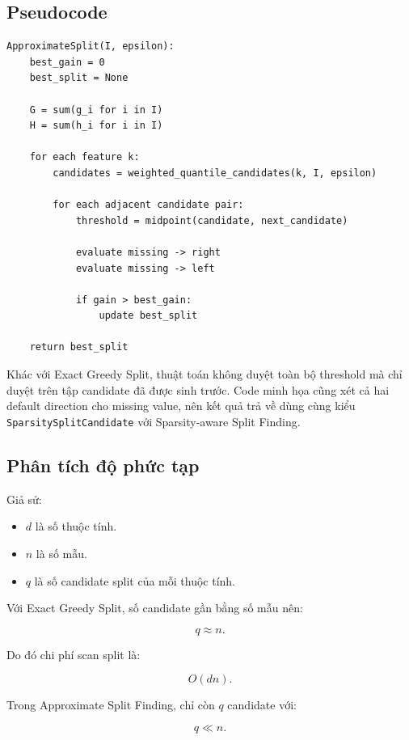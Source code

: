 \subsection{Pseudocode}

\begin{lstlisting}[style=pseudocode,
caption={Approximate Split Finding},
label={lst:approx_split}]
ApproximateSplit(I, epsilon):
    best_gain = 0
    best_split = None

    G = sum(g_i for i in I)
    H = sum(h_i for i in I)

    for each feature k:
        candidates = weighted_quantile_candidates(k, I, epsilon)

        for each adjacent candidate pair:
            threshold = midpoint(candidate, next_candidate)

            evaluate missing -> right
            evaluate missing -> left

            if gain > best_gain:
                update best_split

    return best_split
\end{lstlisting}

Khác với Exact Greedy Split, thuật toán không duyệt toàn bộ threshold mà chỉ duyệt trên tập candidate đã được sinh trước. Code minh họa cũng xét cả hai default direction cho missing value, nên kết quả trả về dùng cùng kiểu \texttt{SparsitySplitCandidate} với Sparsity-aware Split Finding.

\subsection{Phân tích độ phức tạp}

Giả sử:

\begin{itemize}
    \item $d$ là số thuộc tính.
    \item $n$ là số mẫu.
    \item $q$ là số candidate split của mỗi thuộc tính.
\end{itemize}

Với Exact Greedy Split, số candidate gần bằng số mẫu nên:

\[
q \approx n.
\]

Do đó chi phí scan split là:

\[
O(dn).
\]

Trong Approximate Split Finding, chỉ còn $q$ candidate với:

\[
q \ll n.
\]

